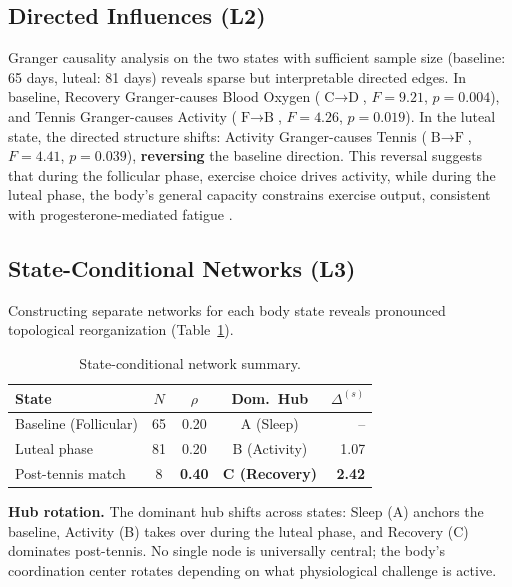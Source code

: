 \documentclass[letterpaper]{article}
\begin{document}
\subsection{Directed Influences (L2)}

Granger causality analysis on the two states with sufficient sample size (baseline: 65 days, luteal: 81 days) reveals sparse but interpretable directed edges. In baseline, Recovery Granger-causes Blood Oxygen ($\text{C} \to \text{D}$, $F = 9.21$, $p = 0.004$), and Tennis Granger-causes Activity ($\text{F} \to \text{B}$, $F = 4.26$, $p = 0.019$). In the luteal state, the directed structure shifts: Activity Granger-causes Tennis ($\text{B} \to \text{F}$, $F = 4.41$, $p = 0.039$), \textbf{reversing} the baseline direction. This reversal suggests that during the follicular phase, exercise choice drives activity, while during the luteal phase, the body's general capacity constrains exercise output, consistent with progesterone-mediated fatigue \citep{mcnulty2020}.

\subsection{State-Conditional Networks (L3)}

Constructing separate networks for each body state reveals pronounced topological reorganization (Table~\ref{tab:results}).

\begin{table}[t]
\caption{State-conditional network summary.}
\label{tab:results}
\vskip 0.1in
\centering
\small
\begin{tabular}{@{}lcccr@{}}
\toprule
State & $N$ & $\rho$ & Dom.\ Hub & $\Delta^{(s)}$ \\
\midrule
Baseline (Follicular) & 65 & 0.20 & A (Sleep) & -- \\
Luteal phase & 81 & 0.20 & B (Activity) & 1.07 \\
Post-tennis match & 8 & \textbf{0.40} & \textbf{C (Recovery)} & \textbf{2.42} \\
\bottomrule
\end{tabular}
\end{table}

\textbf{Hub rotation.} The dominant hub shifts across states: Sleep (A) anchors the baseline, Activity (B) takes over during the luteal phase, and Recovery (C) dominates post-tennis. No single node is universally central; the body's coordination center rotates depending on what physiological challenge is active.
\end{document}
